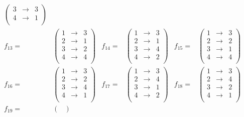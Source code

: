 \documentclass[11pt]{article}
\begin{document}
\begin{flushleft}
\begin{align*}
\begin{pmatrix}
\mathit{3} & \rightarrow & 3\\
4 & \rightarrow & 1\\
\end{pmatrix} \\
f_{13} = &
\begin{pmatrix}
1 & \rightarrow & 3\\
2 & \rightarrow & 1\\
3 & \rightarrow & 2\\
\mathit{4} & \rightarrow & 4\\
\end{pmatrix} &
f_{14} = & 
\begin{pmatrix}
1 & \rightarrow & 3\\
2 & \rightarrow & 1\\
3 & \rightarrow & 4\\
4 & \rightarrow & 2\\
\end{pmatrix} &
f_{15} = & 
\begin{pmatrix}
1 & \rightarrow & 3\\
\mathit{2} & \rightarrow & 2\\
3 & \rightarrow & 1\\
\mathit{4} & \rightarrow & 4\\
\end{pmatrix} \\
f_{16} = &
\begin{pmatrix}
1 & \rightarrow & 3\\
\mathit{2} & \rightarrow & 2\\
3 & \rightarrow & 4\\
4 & \rightarrow & 1\\
\end{pmatrix} &
f_{17} = & 
\begin{pmatrix}
1 & \rightarrow & 3\\
2 & \rightarrow & 4\\
3 & \rightarrow & 1\\
4 & \rightarrow & 2\\
\end{pmatrix} &
f_{18} = & 
\begin{pmatrix}
1 & \rightarrow & 3\\
2 & \rightarrow & 4\\
3 & \rightarrow & 2\\
4 & \rightarrow & 1\\
\end{pmatrix} \\
f_{19} = &
\begin{pmatrix}

\end{pmatrix}
\end{align*}
\end{flushleft}
\end{document}
